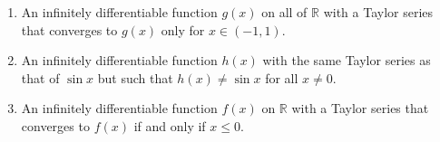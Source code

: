 \documentclass[12pt]{article}
\begin{document}
\begin{enumerate}
	\begin{enumerate}
		\item An infinitely differentiable function $g(x)$ on all of $\mathbb{R}$ with a Taylor series that converges to $g(x)$ only for $x\in (-1, 1)$.
		\vfill
		\item An infinitely differentiable function $h(x)$ with the same Taylor series as that of $\sin x$ but such that $h(x)\neq \sin x$ for all $x\neq 0$.
		\vfill
		\item An infinitely differentiable function $f(x)$ on $\mathbb{R}$ with a Taylor series that converges to $f(x)$ if and only if $x\leq 0$.
		\vfill
	\end{enumerate}
\end{enumerate}
\end{document}
